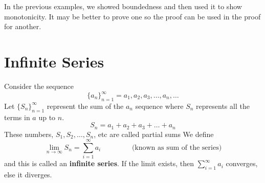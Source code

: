 \documentclass[english, 12pt]{article}
\begin{document}
\begin{note}
In the previous examples, we showed boundedness and then used it to show monotonicity. It may be better to prove one so the proof can be used in the proof for another.
\end{note}
\section{Infinite Series}
Consider the sequence
\[\{a_{n}\}_{n=1}^\infty = a_{1},a_{2},a_{3},\dots,a_{n},\dots \]
Let $\{S_{n}\}_{n=1}^\infty$ represent the sum of the $a_{n}$ sequence where $S_{n}$ represents all the terms in $a$ up to $n$.
\[S_{n} = a_{1}+a_{2}+a_{3}+\dots+a_{n} \]
These numbers, $S_{1},S_{2},\dots,S_{n}$, etc are called partial sums
We define
\[\lim_{n\to\infty} S_{n} = \sum_{i=1}^\infty a_{i} \qquad\qquad \text { (known as sum of the series)} \]
and this is called an \textbf{infinite series}. If the limit exists, then $\sum_{i=1}^\infty a_{i} $ converges, else it diverges.
\end{document}
